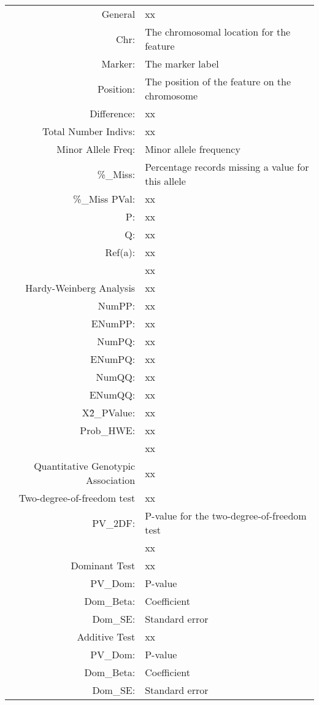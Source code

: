\vspace{1em}
\begin{supertabular}{r p{5in}}
  General & xx ~ \\
    Chr: & The chromosomal location for the feature \\
    Marker: & The marker label \\
    Position: & The position of the feature on the chromosome \\
    Difference: & xx \\
    Total Number Indivs: & xx \\
    Minor Allele Freq: & Minor allele frequency\\
    \%{}\_Miss: & Percentage records missing a value for this allele\\
    \%{}\_Miss PVal: & xx \\
    P: & xx \\
    Q: & xx \\
    Ref(a): & xx \\
    ~ & xx ~\\[1em]
  Hardy-Weinberg Analysis & xx ~ \\
    NumPP: & xx    \\
    ENumPP: & xx    \\
    NumPQ: & xx    \\
    ENumPQ: & xx    \\
    NumQQ: & xx    \\
    ENumQQ: & xx    \\
    X\^2\_PValue: & xx    \\
    Prob\_HWE: & xx     \\
    ~ & xx ~ \\
  Quantitative Genotypic Association & xx \\
          Two-degree-of-freedom test & xx \\
   PV\_2DF: & P-value for the two-degree-of-freedom test \\
   ~ & xx ~ \\[1em]
  Dominant Test & xx ~ \\
      PV\_Dom: & P-value \\
      Dom\_Beta: & Coefficient \\
      Dom\_SE: & Standard error \\[1em]

   Additive Test & xx ~ \\
      PV\_Dom: & P-value \\
      Dom\_Beta: & Coefficient \\
      Dom\_SE: & Standard error \\[1em]


\end{supertabular}
